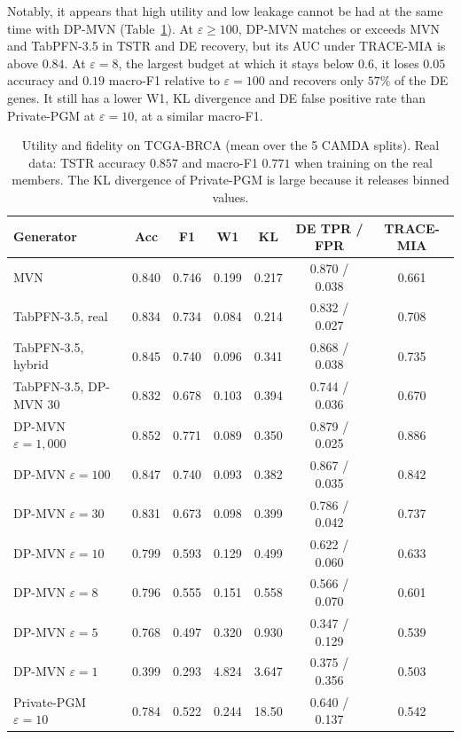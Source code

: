 \documentclass{article}
\newcommand{\dpmvn}{DP-MVN}
\newcommand{\ours}{TRACE-MIA}
\begin{document}
Notably, it appears that high utility and low leakage cannot be had at the same time with \dpmvn{} (Table~\ref{tab:utility}). At $\varepsilon\ge 100$, \dpmvn{} matches or exceeds MVN and TabPFN-3.5 in TSTR and DE recovery, but its AUC under \ours{} is above $0.84$. At $\varepsilon=8$, the largest budget at which it stays below $0.6$, it loses $0.05$ accuracy and $0.19$ macro-F1 relative to $\varepsilon=100$ and recovers only $57\%$ of the DE genes. It still has a lower W1, KL divergence and DE false positive rate than Private-PGM at $\varepsilon=10$, at a similar macro-F1.

\begin{table}[h]
\centering
\caption{Utility and fidelity on TCGA-BRCA (mean over the 5 CAMDA splits). Real data: TSTR accuracy $0.857$ and macro-F1 $0.771$ when training on the real members. The KL divergence of Private-PGM is large because it releases binned values.}
\label{tab:utility}
\footnotesize
\setlength{\tabcolsep}{3pt}
\begin{tabular}{lcccccc}
\toprule
Generator & Acc & F1 & W1 & KL & DE TPR / FPR & \ours{} \\
\midrule
MVN                          & 0.840 & 0.746 & 0.199 & 0.217 & 0.870 / 0.038 & 0.661 \\
TabPFN-3.5, real             & 0.834 & 0.734 & 0.084 & 0.214 & 0.832 / 0.027 & 0.708 \\
TabPFN-3.5, hybrid           & 0.845 & 0.740 & 0.096 & 0.341 & 0.868 / 0.038 & 0.735 \\
TabPFN-3.5, \dpmvn{} $30$    & 0.832 & 0.678 & 0.103 & 0.394 & 0.744 / 0.036 & 0.670 \\
\midrule
\dpmvn{} $\varepsilon=1{,}000$ & 0.852 & 0.771 & 0.089 & 0.350 & 0.879 / 0.025 & 0.886 \\
\dpmvn{} $\varepsilon=100$   & 0.847 & 0.740 & 0.093 & 0.382 & 0.867 / 0.035 & 0.842 \\
\dpmvn{} $\varepsilon=30$    & 0.831 & 0.673 & 0.098 & 0.399 & 0.786 / 0.042 & 0.737 \\
\dpmvn{} $\varepsilon=10$    & 0.799 & 0.593 & 0.129 & 0.499 & 0.622 / 0.060 & 0.633 \\
\dpmvn{} $\varepsilon=8$     & 0.796 & 0.555 & 0.151 & 0.558 & 0.566 / 0.070 & 0.601 \\
\dpmvn{} $\varepsilon=5$     & 0.768 & 0.497 & 0.320 & 0.930 & 0.347 / 0.129 & 0.539 \\
\dpmvn{} $\varepsilon=1$     & 0.399 & 0.293 & 4.824 & 3.647 & 0.375 / 0.356 & 0.503 \\
\midrule
Private-PGM $\varepsilon=10$ & 0.784 & 0.522 & 0.244 & 18.50 & 0.640 / 0.137 & 0.542 \\
\bottomrule
\end{tabular}
\end{table}
\end{document}
